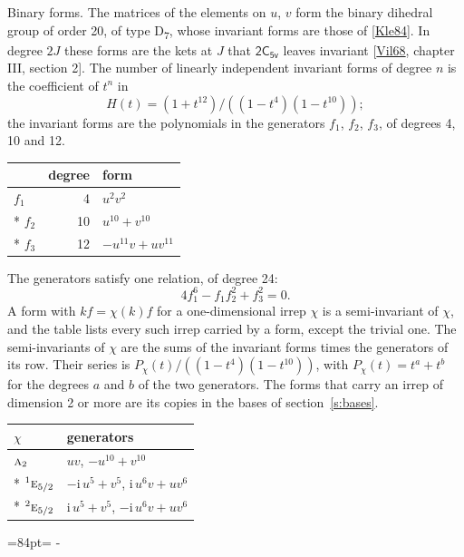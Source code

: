 \documentclass[10pt,a4paper]{article}
\makeatletter
\renewcommand\paragraph{\@startsection{paragraph}{4}{\z@}{1.5ex plus .5ex minus .2ex}{-1em}%
  {\normalfont\small\sffamily\bfseries\color{parttitle}}}
\newcommand{\needspace}[1]{\par\penalty-100\begingroup\dimen0=#1\relax\dimen2=\pagegoal
  \advance\dimen2-\pagetotal\ifdim\dimen0>\dimen2\relax\ifdim\dimen2>0pt\vfil\break\fi\fi
  \endgroup}
\numberwithin{equation}{section}
\newcommand{\grp}[1]{\mathsf{#1}}
\newcommand{\irr}[1]{\text{\normalfont\scshape #1}}
\newcommand{\conjpair}[1]{{}^{#1}}
\newcommand{\iunit}{\mathrm{i}}
\makeatother
\begin{document}
\paragraph{Binary forms.}
The matrices of the elements on $u$, $v$ form the binary dihedral group of order 20, of type D\textsubscript{7}, whose invariant forms are those of [\href{../../../REFERENCES.pdf\#ref.Kle84}{Kle84}]. In degree $2J$ these forms are the kets at $J$ that $\grp{2C_{5v}}$ leaves invariant [\href{../../../REFERENCES.pdf\#ref.Vil68}{Vil68}, chapter III, section 2]. \label{n:head.degree}\label{n:head.form}The number of linearly independent invariant forms of degree $n$ is the coefficient of $t^n$ in
\begin{equation}\label{e:molien}H(t) = (1 + t^{12})/((1-t^{4})(1-t^{10}));\end{equation}
the invariant forms are the polynomials in the generators $f_1$, $f_2$, $f_3$, of degrees 4, 10 and 12.
{\small\begin{longtable}{@{}lrl@{}}\toprule
& degree & form\\\midrule\endhead
\bottomrule\endfoot\endlastfoot
$f_{1}$ & 4 & $u^{2}v^{2}$\\*
$f_{2}$ & 10 & $u^{10} + v^{10}$\\*
$f_{3}$ & 12 & $-u^{11}v + uv^{11}$\\
\bottomrule\end{longtable}}
The generators satisfy one relation, of degree 24:
\begin{equation}\label{e:relation}4f_{1}^{6} - f_{1}f_{2}^{2} + f_{3}^{2} = 0.\end{equation}
A form with $k f = \chi(k) f$ for a one-dimensional irrep $\chi$ is a semi-invariant of $\chi$, and the table lists every such irrep carried by a form, except the trivial one. \label{n:head.generators}The semi-invariants of $\chi$ are the sums of the invariant forms times the generators of its row. Their series is $P_\chi(t)/((1-t^{4})(1-t^{10}))$, with $P_\chi(t) = t^{a} + t^{b}$ for the degrees $a$ and $b$ of the two generators. The forms that carry an irrep of dimension 2 or more are its copies in the bases of section~\ref{s:bases}.
{\small\begin{longtable}{@{}ll@{}}\toprule
$\chi$ & generators\\\midrule\endhead
\bottomrule\endfoot\endlastfoot
$\irr{a}_{2}$ & $uv$, $-u^{10} + v^{10}$\\*
$\conjpair{1}\irr{e}_{5/2}$ & $-\iunit{}\,u^{5} + v^{5}$, $\iunit{}\,u^{6}v + uv^{6}$\\*
$\conjpair{2}\irr{e}_{5/2}$ & $\iunit{}\,u^{5} + v^{5}$, $-\iunit{}\,u^{6}v + uv^{6}$\\
\bottomrule\end{longtable}}
\needspace{84pt}
\end{document}
